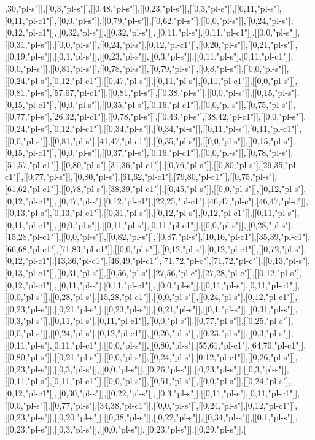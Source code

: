 ,30,"pl-s"]],[[0,3,"pl-s"]],[[0,48,"pl-s"]],[[0,23,"pl-s"]],[[0,3,"pl-s"]],[[0,11,"pl-s"],[0,11,"pl-c1"]],[[0,0,"pl-s"]],[[0,79,"pl-s"]],[[0,62,"pl-s"]],[[0,0,"pl-s"]],[[0,24,"pl-s"],[0,12,"pl-c1"]],[[0,32,"pl-s"]],[[0,32,"pl-s"]],[[0,11,"pl-s"],[0,11,"pl-c1"]],[[0,0,"pl-s"]],[[0,31,"pl-s"]],[[0,0,"pl-s"]],[[0,24,"pl-s"],[0,12,"pl-c1"]],[[0,20,"pl-s"]],[[0,21,"pl-s"]],[[0,19,"pl-s"]],[[0,1,"pl-s"]],[[0,23,"pl-s"]],[[0,3,"pl-s"]],[[0,11,"pl-s"],[0,11,"pl-c1"]],[[0,0,"pl-s"]],[[0,81,"pl-s"]],[[0,78,"pl-s"]],[[0,79,"pl-s"]],[[0,8,"pl-s"]],[[0,0,"pl-s"]],[[0,24,"pl-s"],[0,12,"pl-c1"]],[[0,47,"pl-s"]],[[0,11,"pl-s"],[0,11,"pl-c1"]],[[0,0,"pl-s"]],[[0,81,"pl-s"],[57,67,"pl-c1"]],[[0,81,"pl-s"]],[[0,38,"pl-s"]],[[0,0,"pl-s"]],[[0,15,"pl-s"],[0,15,"pl-c1"]],[[0,0,"pl-s"]],[[0,35,"pl-s"],[0,16,"pl-c1"]],[[0,0,"pl-s"]],[[0,75,"pl-s"]],[[0,77,"pl-s"],[26,32,"pl-c1"]],[[0,78,"pl-s"]],[[0,43,"pl-s"],[38,42,"pl-c1"]],[[0,0,"pl-s"]],[[0,24,"pl-s"],[0,12,"pl-c1"]],[[0,34,"pl-s"]],[[0,34,"pl-s"]],[[0,11,"pl-s"],[0,11,"pl-c1"]],[[0,0,"pl-s"]],[[0,81,"pl-s"],[41,47,"pl-c1"]],[[0,35,"pl-s"]],[[0,0,"pl-s"]],[[0,15,"pl-s"],[0,15,"pl-c1"]],[[0,0,"pl-s"]],[[0,37,"pl-s"],[0,16,"pl-c1"]],[[0,0,"pl-s"]],[[0,78,"pl-s"],[51,57,"pl-c1"]],[[0,80,"pl-s"],[31,36,"pl-c1"]],[[0,76,"pl-s"]],[[0,80,"pl-s"],[29,35,"pl-c1"]],[[0,77,"pl-s"]],[[0,80,"pl-s"],[61,62,"pl-c1"],[79,80,"pl-c1"]],[[0,75,"pl-s"],[61,62,"pl-c1"]],[[0,78,"pl-s"],[38,39,"pl-c1"]],[[0,45,"pl-s"]],[[0,0,"pl-s"]],[[0,12,"pl-s"],[0,12,"pl-c1"]],[[0,47,"pl-s"],[0,12,"pl-c1"],[22,25,"pl-c1"],[46,47,"pl-c"],[46,47,"pl-c"]],[[0,13,"pl-s"],[0,13,"pl-c1"]],[[0,31,"pl-s"]],[[0,12,"pl-s"],[0,12,"pl-c1"]],[[0,11,"pl-s"],[0,11,"pl-c1"]],[[0,0,"pl-s"]],[[0,11,"pl-s"],[0,11,"pl-c1"]],[[0,0,"pl-s"]],[[0,28,"pl-s"],[15,28,"pl-c1"]],[[0,0,"pl-s"]],[[0,82,"pl-s"]],[[0,87,"pl-s"],[10,16,"pl-c1"],[35,39,"pl-c1"],[66,68,"pl-c1"],[71,83,"pl-c1"]],[[0,0,"pl-s"]],[[0,12,"pl-s"],[0,12,"pl-c1"]],[[0,72,"pl-s"],[0,12,"pl-c1"],[13,36,"pl-c1"],[46,49,"pl-c1"],[71,72,"pl-c"],[71,72,"pl-c"]],[[0,13,"pl-s"],[0,13,"pl-c1"]],[[0,31,"pl-s"]],[[0,56,"pl-s"],[27,56,"pl-c"],[27,28,"pl-c"]],[[0,12,"pl-s"],[0,12,"pl-c1"]],[[0,11,"pl-s"],[0,11,"pl-c1"]],[[0,0,"pl-s"]],[[0,11,"pl-s"],[0,11,"pl-c1"]],[[0,0,"pl-s"]],[[0,28,"pl-s"],[15,28,"pl-c1"]],[[0,0,"pl-s"]],[[0,24,"pl-s"],[0,12,"pl-c1"]],[[0,23,"pl-s"]],[[0,21,"pl-s"]],[[0,23,"pl-s"]],[[0,21,"pl-s"]],[[0,1,"pl-s"]],[[0,31,"pl-s"]],[[0,3,"pl-s"]],[[0,11,"pl-s"],[0,11,"pl-c1"]],[[0,0,"pl-s"]],[[0,77,"pl-s"]],[[0,25,"pl-s"]],[[0,0,"pl-s"]],[[0,24,"pl-s"],[0,12,"pl-c1"]],[[0,26,"pl-s"]],[[0,23,"pl-s"]],[[0,3,"pl-s"]],[[0,11,"pl-s"],[0,11,"pl-c1"]],[[0,0,"pl-s"]],[[0,80,"pl-s"],[55,61,"pl-c1"],[64,70,"pl-c1"]],[[0,80,"pl-s"]],[[0,21,"pl-s"]],[[0,0,"pl-s"]],[[0,24,"pl-s"],[0,12,"pl-c1"]],[[0,26,"pl-s"]],[[0,23,"pl-s"]],[[0,3,"pl-s"]],[[0,0,"pl-s"]],[[0,26,"pl-s"]],[[0,23,"pl-s"]],[[0,3,"pl-s"]],[[0,11,"pl-s"],[0,11,"pl-c1"]],[[0,0,"pl-s"]],[[0,51,"pl-s"]],[[0,0,"pl-s"]],[[0,24,"pl-s"],[0,12,"pl-c1"]],[[0,30,"pl-s"]],[[0,22,"pl-s"]],[[0,3,"pl-s"]],[[0,11,"pl-s"],[0,11,"pl-c1"]],[[0,0,"pl-s"]],[[0,77,"pl-s"],[34,38,"pl-c1"]],[[0,0,"pl-s"]],[[0,24,"pl-s"],[0,12,"pl-c1"]],[[0,23,"pl-s"]],[[0,20,"pl-s"]],[[0,38,"pl-s"]],[[0,22,"pl-s"]],[[0,34,"pl-s"]],[[0,1,"pl-s"]],[[0,23,"pl-s"]],[[0,3,"pl-s"]],[[0,0,"pl-s"]],[[0,23,"pl-s"]],[[0,29,"pl-s"]],[